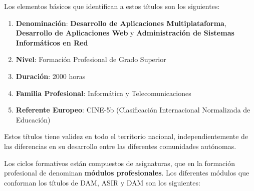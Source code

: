  Los elementos básicos que identifican a estos títulos son los siguientes:

 \begin{enumerate}
    \item \textbf{Denominación}: \textbf{Desarrollo de Aplicaciones Multiplataforma}, \textbf{Desarrollo de Aplicaciones Web} y \textbf{Administración de Sistemas Informáticos en Red}
    \item \textbf{Nivel}: Formación Profesional de Grado Superior
    \item \textbf{Duración}: 2000 horas
    \item \textbf{Familia Profesional}: Informática y Telecomunicaciones
    \item \textbf{Referente Europeo}: CINE-5b (Clasificación Internacional Normalizada de Educación)
\end{enumerate}

 Estos títulos tiene validez en todo el territorio nacional, independientemente de las diferencias en su desarrollo entre las diferentes comunidades autónomas.

 Los ciclos formativos están compuestos de asignaturas, que en la formación profesional de denominan \textbf{módulos profesionales}. Los diferentes módulos que conforman los títulos de DAM, ASIR y DAM son los siguientes:

